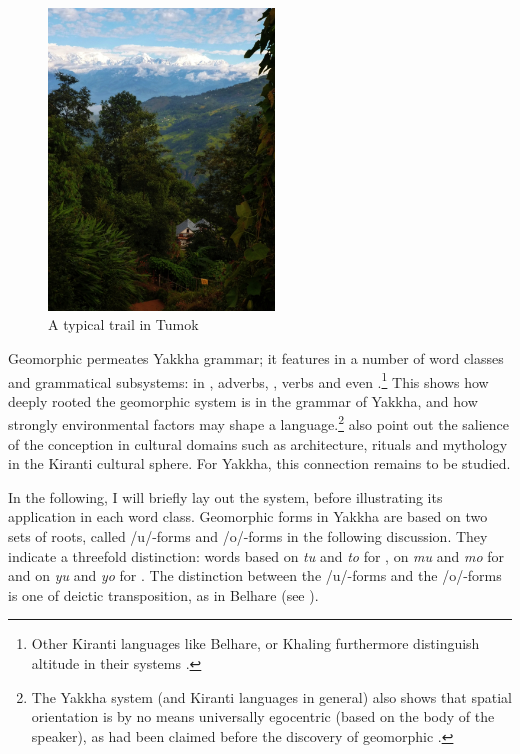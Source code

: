 \begin{figure}
\centering
\includegraphics[width=6cm]{figures/tumok-path.jpg}
\caption{A typical trail in Tumok}\label{tumok-path}
\end{figure}

Geomorphic  permeates Yakkha grammar;  it features in a number of word classes and grammatical subsystems: in , adverbs, ,  verbs and even .\footnote{Other Kiranti languages like Belhare,  or Khaling furthermore distinguish altitude in their   systems \citep{Ebert1994The-structure, Bickel1997Spatial}.} This shows how deeply rooted the geomorphic system is in the grammar of Yakkha, and how strongly environmental factors may shape a language.\footnote{The Yakkha system (and Kiranti languages in general) also shows that spatial orientation is by no means universally egocentric (based on the body of the speaker), as had been claimed before the discovery of geomorphic .} \citet{Bickeletal1999Cultural} also point out the salience of the  conception in cultural domains such as architecture, rituals and mythology in the Kiranti cultural sphere. For Yakkha, this connection remains to be studied.

In the following, I will briefly lay out the system, before illustrating its application in each word class. Geomorphic forms in Yakkha are based on two sets of roots, called /u/-forms and /o/-forms in the following discussion. They indicate  a threefold distinction: words based on \emph{tu} and \emph{to} for , on \emph{mu} and \emph{mo} for  and on \emph{yu} and \emph{yo} for . The distinction between the /u/-forms and the /o/-forms is one of deictic transposition, as in Belhare (see \citealt{Bickel1997Spatial, Bickel2001Deictic}). 

